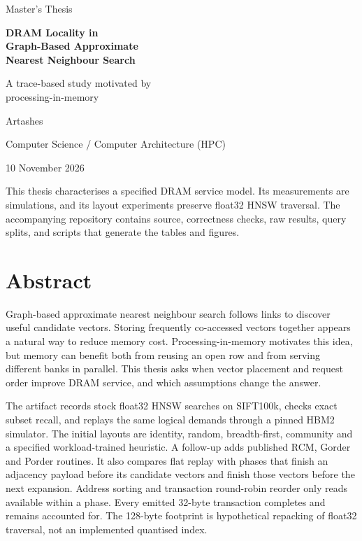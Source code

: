 \documentclass[11pt,a4paper]{report}
\begin{document}
\hypersetup{pageanchor=false}
\begin{titlepage}
\centering
\vspace*{2cm}
{\large Master's Thesis\par}
\vspace{1.2cm}
{\Huge\bfseries DRAM Locality in\\Graph-Based Approximate\\Nearest Neighbour Search\par}
\vspace{1cm}
{\Large\color{accent} A trace-based study motivated by\\processing-in-memory\par}
\vspace{2cm}
{\large Artashes\par}
{Computer Science / Computer Architecture (HPC)\par}
\vfill
{10 November 2026\par}
\vspace{0.6cm}
\begin{minipage}{0.88\textwidth}\small
This thesis characterises a specified DRAM service model. Its measurements are simulations, and its layout experiments preserve float32 HNSW traversal. The accompanying repository contains source, correctness checks, raw results, query splits, and scripts that generate the tables and figures.
\end{minipage}
\end{titlepage}
\hypersetup{pageanchor=true}
\chapter*{Abstract}
Graph-based approximate nearest neighbour search follows links to discover useful candidate vectors. Storing frequently co-accessed vectors together appears a natural way to reduce memory cost. Processing-in-memory motivates this idea, but memory can benefit both from reusing an open row and from serving different banks in parallel. This thesis asks when vector placement and request order improve DRAM service, and which assumptions change the answer.

The artifact records stock float32 HNSW searches on SIFT100k, checks exact subset recall, and replays the same logical demands through a pinned HBM2 simulator. The initial layouts are identity, random, breadth-first, community and a specified workload-trained heuristic. A follow-up adds published RCM, Gorder and Porder routines. It also compares flat replay with phases that finish an adjacency payload before its candidate vectors and finish those vectors before the next expansion. Address sorting and transaction round-robin reorder only reads available within a phase. Every emitted 32-byte transaction completes and remains accounted for. The 128-byte footprint is hypothetical repacking of float32 traversal, not an implemented quantised index.
\end{document}
